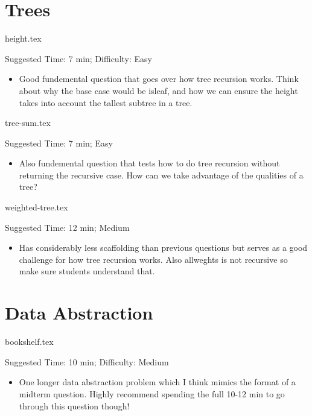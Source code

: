 \documentclass{exam}
\begin{document}
\section{Trees}
\begin{questions}
    {height.tex}
    \begin{questionmeta}
        Suggested Time: 7 min; Difficulty: Easy
        \begin{itemize}
            \item  Good fundemental question that goes over how tree recursion works. Think about why the base case would be isleaf, and how we can ensure the height takes into account the tallest subtree in a tree. 
        \end{itemize}
      \end{questionmeta}    
      
      {tree-sum.tex}
      \begin{questionmeta}
          Suggested Time: 7 min; Easy
          \begin{itemize}
              \item  Also fundemental question that tests how to do tree recursion without returning the recursive case. How can we take advantage of the qualities of a tree? 
          \end{itemize}
        \end{questionmeta}

        \newpage

        {weighted-tree.tex}
        \begin{questionmeta}
            Suggested Time: 12 min; Medium
            \begin{itemize}
              \item  Has considerably less scaffolding than previous questions but serves as a good challenge for how tree recursion works. Also allweghts is not recursive so make sure students understand that. 
          \end{itemize}
        \end{questionmeta}
\end{questions}

\section{Data Abstraction}
\begin{questions}
    {bookshelf.tex}
    \begin{questionmeta}
        Suggested Time: 10 min; Difficulty: Medium
        \begin{itemize}
            \item  One longer data abstraction problem which I think mimics the format of a midterm question. Highly recommend spending the full 10-12 min to go through this question though! 
        \end{itemize}
      \end{questionmeta}    
\end{questions}
\end{document}
